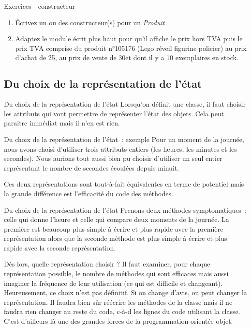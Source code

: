 \begin{frame}{Exercices - constructeur}
		\begin{enumerate}
			\item {
				Écrivez un ou des constructeur(s) pour un \textit{Produit}}
			\item {
				Adaptez le module écrit plus haut pour qu'il affiche le prix hors TVA
				puis le prix TVA comprise du produit n°105176 (Lego réveil figurine policier)
				au prix d'achat de 25\texteuro, au prix de vente de 30\texteuro et 
				dont il y a 10 exemplaires en stock.}
		\end{enumerate}
\end{frame}

\subsection{Du choix de la représentation de l'état}

\begin{frame}{Du choix de la représentation de l'état}
	Lorsqu'on définit une classe, il faut choisir les
	attributs qui vont permettre de représenter l'état des
	objets. Cela peut paraitre immédiat mais il n'en est
	rien.
\end{frame}

\begin{frame}{Du choix de la représentation de l'état~: exemple}
	Pour un moment de la journée, nous avons choisi
	d'utiliser trois attributs entiers (les heures, les
	minutes et les secondes). Nous aurions tout aussi bien pu choisir
	d'utiliser un seul entier représentant le nombre de
	secondes écoulées depuis minuit.
	
	\bigskip
	
	Ces deux représentations sont tout-à-fait équivalentes en terme de
	potentiel mais la grande différence est l'efficacité
	du code des méthodes. 
\end{frame}

\begin{frame}{Du choix de la représentation de l'état}
	Prenons deux méthodes symptomatiques~: celle qui donne
	l'heure et celle qui compare deux moments de la
	journée. La première est beaucoup plus simple à écrire et plus rapide
	avec la première représentation alors que la seconde méthode est plus
	simple à écrire et plus rapide avec la seconde représentation.
	
	\bigskip
	
	Dès lors, quelle représentation choisir ? Il faut examiner, pour chaque
	représentation possible, le nombre de méthodes qui sont efficaces mais
	aussi imaginer la fréquence de leur utilisation (ce qui est difficile
	et changeant). Heureusement, ce choix n'est pas
	définitif. Si on change d'avis, on peut changer la
	représentation. Il faudra bien sûr réécrire les méthodes de la classe
	mais il ne faudra rien changer au reste du code, c-à-d les lignes du
	code utilisant la classe. C’est d’ailleurs là une des grandes forces de
	la programmation orientée objet.
\end{frame}


